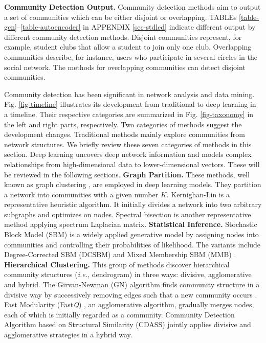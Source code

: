 \vspace{2mm}
\noindent
\textbf{Community Detection Output.} 
Community detection methods aim to output a set of communities which can be either disjoint or overlapping. TABLEs \ref{table-gcn}--\ref{table-autoencoder} in APPENDIX \ref{sec-stdlcd} indicate different output by different community detection methods. Disjoint communities represent, for example, student clubs that allow a student to join only one club. Overlapping communities describe, for instance, users who participate in several circles in the social network. The methods for overlapping communities can detect disjoint communities.

\label{sec-traditional-alg}
Community detection has been significant in network analysis and data mining. Fig. \ref{fig-timeline} illustrates its development from traditional to deep learning in a timeline. Their respective categories are summarized in Fig. \ref{fig-taxonomy} in the left and right parts, respectively. Two categories of methods suggest the development changes. Traditional methods mainly explore communities from network structures. We briefly review these seven categories of methods in this section. Deep learning uncovers deep network information and models complex relationships from high-dimensional data to lower-dimensional vectors. These will be reviewed in the following sections.
\vspace{2mm}
\noindent
\textbf{Graph Partition.} These methods, well known as graph clustering , are employed in deep learning models. They partition a network into communities with a given number $K$. Kernighan-Lin  is a representative heuristic algorithm. It initially divides a network into two arbitrary subgraphs and optimizes on nodes. Spectral bisection  is another representative method applying spectrum Laplacian matrix.
\vspace{2mm}
\noindent
\textbf{Statistical Inference.} Stochastic Block Model (SBM)  is a widely applied generative model by assigning nodes into communities and controlling their probabilities of likelihood. The variants include Degree-Corrected SBM (DCSBM)  and Mixed Membership SBM (MMB) .
\vspace{2mm}
\noindent
\textbf{Hierarchical Clustering.} This group of methods discover hierarchical community structures (\textit{i.e.}, dendrogram) in three ways: divisive, agglomerative and hybrid. The Girvan-Newman (GN) algorithm finds community structure in a divisive way by successively removing edges such that a new community occurs . Fast Modularity (Fast\textit{Q}) , an agglomerative algorithm, gradually merges nodes, each of which is initially regarded as a community. Community Detection Algorithm based on Structural Similarity (CDASS)  jointly applies divisive and agglomerative strategies in a hybrid way. 
